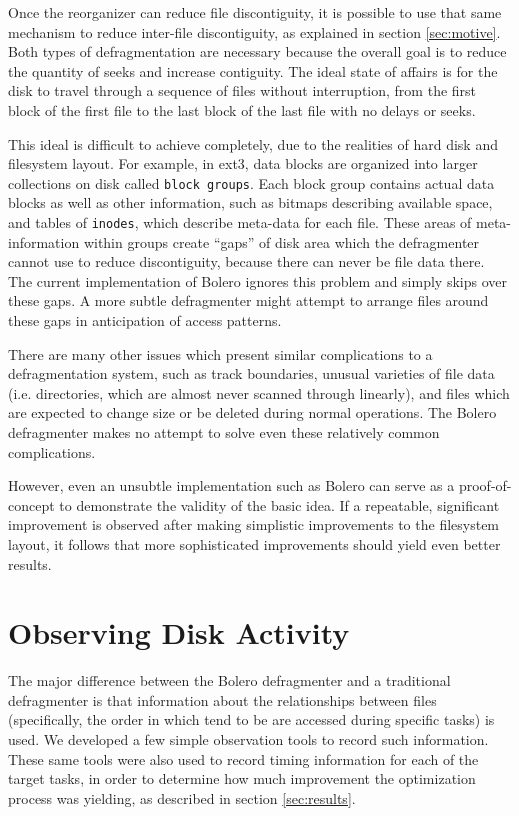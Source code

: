 \documentclass[10pt,twocolumn,letterpaper]{article}
\begin{document}
Once the reorganizer can reduce file discontiguity, it is possible to
use that same mechanism to reduce inter-file discontiguity, as explained
in section \ref{sec:motive}. Both types of defragmentation are necessary because the overall goal is to reduce the quantity of seeks and increase contiguity. The ideal state of affairs is for the disk to travel through
a sequence of files without interruption\cite{autolocality}, from the first block of the first file to the last
block of the last file with no delays or seeks.

This ideal is difficult to achieve completely, due to the realities of hard disk
and filesystem layout. For example, in ext3, data blocks are organized into larger
collections on disk called \texttt{block groups}\cite{ext2intro}. Each
block group contains actual data blocks as well as other information, such
as bitmaps describing available space, and tables of \texttt{inodes},
which describe meta-data for each file. These areas of meta-information within
groups create ``gaps'' of disk area which the defragmenter cannot
use to reduce discontiguity, because there can never be file data there.
The current implementation of Bolero ignores this problem and simply
skips over these gaps. A more subtle defragmenter might attempt to arrange
files around these gaps in anticipation of access patterns.

There are many other issues which present similar complications to a defragmentation
system, such as track boundaries, unusual varieties of file data (i.e. directories, which
are almost never scanned through linearly), and files which are expected to change
size or be deleted during normal operations. The Bolero defragmenter makes no attempt to
solve even these relatively common complications.

However, even an unsubtle implementation such as Bolero can serve as a proof-of-concept
to demonstrate the validity of the basic idea. If a repeatable, significant improvement
is observed after making simplistic improvements to the filesystem layout, it follows
that more sophisticated improvements should yield even better results.

\section{Observing Disk Activity}\label{sec:observing}

The major difference between the Bolero defragmenter and a traditional defragmenter
is that information about the relationships between files (specifically, the order
in which tend to be are accessed during specific tasks) is used. We developed a few
simple observation tools to record such information. These same tools were also used to record
timing information for each of the target tasks, in order to determine how much improvement
the optimization process was yielding, as described in section \ref{sec:results}.
\end{document}
